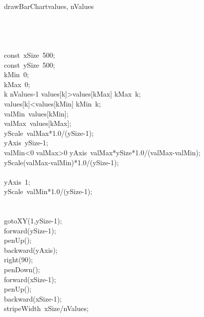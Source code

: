 \documentclass[a4paper,10pt]{article}
\begin{document}
\begin{pseudocode}{drawBarChart}{values, nValues }
\label{drawBarChart}
\\
\\
\\
\\
  \\
  const\ xSize\gets\ 500;\\
  const\ ySize\gets\ 500;\\
  kMin\gets\ 0;\\
  kMax\gets\ 0;\\
  \FOR k  \TO nValues-1  \DO
    \IF values[k]>values[kMax] \THEN
      kMax\gets\ k;\\
    \ELSE
      \IF values[k]<values[kMin] \THEN
        kMin\gets\ k;\\
  valMin\gets\ values[kMin];\\
  valMax\gets\ values[kMax];\\
  yScale\gets\ valMax*1.0/(ySize-1);\\
  yAxis\gets\ ySize-1;\\
  \IF valMin<0 \THEN
    \IF valMax>0 \THEN
    \BEGIN
      yAxis\gets\ valMax*ySize*1.0/(valMax-valMin);\\
      yScale\gets(valMax-valMin)*1.0/(ySize-1);\\
    \END\\
    \ELSE
    \BEGIN
      yAxis\gets\ 1;\\
      yScale\gets\ valMin*1.0/(ySize-1);\\
    \END\\
  \\
  gotoXY(1,ySize-1);\\
  forward(ySize-1);\\
  penUp();\\
  backward(yAxis);\\
  right(90);\\
  penDown();\\
  forward(xSize-1);\\
  penUp();\\
  backward(xSize-1);\\
  stripeWidth\gets\ xSize/nValues;\\

\end{pseudocode}
\end{document}
